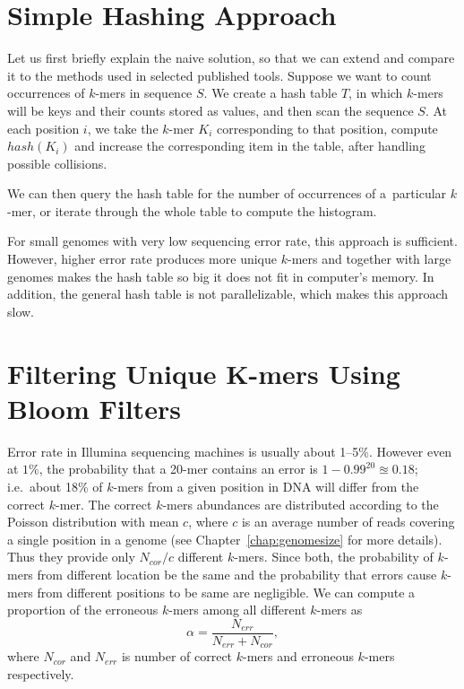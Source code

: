 \section{Simple Hashing Approach}

Let us first briefly explain the naive solution, so that we can extend and compare it to the methods used in selected published tools.
Suppose we want to count occurrences of $k$-mers in sequence $S$.
We create a hash table $T$, in which $k$-mers will be keys and their counts stored as values, and then scan the sequence $S$.
At each position $i$, we take the $k$-mer $K_i$ corresponding to that  position, compute $hash(K_i)$ and increase the corresponding item in the table, after handling possible collisions.

We can then query the hash table for the number of occurrences of a~particular $k$-mer, or iterate through the whole table to compute the histogram.

For small genomes with very low sequencing error rate, this approach is sufficient. However, higher error rate produces more unique $k$-mers and together with large genomes makes the hash table so big it does not fit in computer's memory. In addition, the general hash table is not parallelizable, which makes this approach slow.

\section[Filtering Unique K-mers]{Filtering Unique K-mers Using Bloom Filters}

Error rate in Illumina sequencing machines is usually about 1--5\%. However even at $1\%$, the probability that a 20-mer contains an error is $1 - 0.99^{20} \approxeq 0.18$; i.e.\ about 18\% of $k$-mers from a given position in DNA will differ from the correct $k$-mer.
The correct $k$-mers abundances are distributed according to the Poisson distribution with mean $c$, where $c$ is an average number of reads covering a single position in a genome (see Chapter~\ref{chap:genomesize} for more details). Thus they provide only $N_{cor}/c$ different $k$-mers.
Since both, the probability of $k$-mers from different location be the same and the probability that errors cause $k$-mers from different positions to be same are negligible. We can compute a proportion of the erroneous $k$-mers among all different $k$-mers as $$\alpha = \frac{N_{err}}{N_{err} + N_{cor}},$$
where $N_{cor}$ and $N_{err}$ is number of correct $k$-mers and erroneous $k$-mers respectively.

